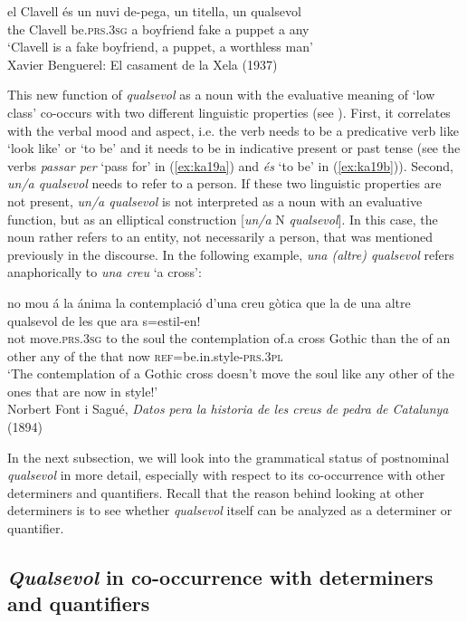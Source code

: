 \documentclass[output=paper,colorlinks,citecolor=brown]{langscibook}
\begin{document}
\ex\label{ex:ka19b} \gll el Clavell és un nuvi de-pega, un titella, un qualsevol \\
        the Clavell be.\textsc{prs.3sg} a boyfriend fake a puppet a any\\
    \glt ‘Clavell is a fake boyfriend, a puppet, a worthless man’\\
        Xavier Benguerel: El casament de la Xela (1937)
    \z
\z

This new function of \textit{qualsevol} as a noun with the evaluative meaning of ‘low class’ co-occurs with two different linguistic properties (see ). First, it correlates with the verbal mood and aspect, i.e. the verb needs to be a predicative verb like ‘look like’ or ‘to be’ and it needs to be in indicative present or past tense (see the verbs \textit{passar per} ‘pass for’ in (\ref{ex:ka19a}) and \textit{és} ‘to be’ in (\ref{ex:ka19b})). Second, \textit{un/a qualsevol} needs to refer to a person. If these two linguistic properties are not present, \textit{un/a qualsevol} is not interpreted as a noun with an evaluative function, but as an elliptical construction [\textit{un/a} N \textit{qualsevol}]. In this case, the noun rather refers to an entity, not necessarily a person, that was mentioned previously in the discourse. In the following example, \textit{una (altre) qualsevol} refers anaphorically to \textit{una creu} ‘a cross’:

\ea \label{ex:ka20}
\gll no mou á la ánima la contemplació d'una creu gòtica que la de una altre qualsevol de les que ara s=estil-en!\\
    not move.\textsc{prs.3sg} to the soul the contemplation of.a cross Gothic than the of an other any of the that now \textsc{ref}=be.in.style-\textsc{prs.3pl}\\
\glt ‘The contemplation of a Gothic cross doesn’t move the soul like any other of the ones that are now in style!’\\
    Norbert Font i Sagué, \textit{Datos pera la historia de les creus de pedra de Catalunya} (1894)
\z

In the next subsection, we will look into the grammatical status of postnominal \textit{qualsevol} in more detail, especially with respect to its co-occurrence with other determiners and quantifiers. Recall that the reason behind looking at other determiners is to see whether \textit{qualsevol} itself can be analyzed as a determiner or quantifier.


\subsection{\textit{Qualsevol} in co-occurrence with determiners and quantifiers}\label{sec:kea5.4}
\end{document}
